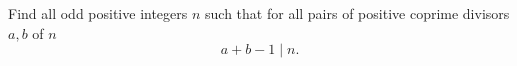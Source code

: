 Find all odd positive integers $n$ such that for all pairs of positive coprime divisors $a,b$ of $n$ 
$$a+b-1\mid n.$$
